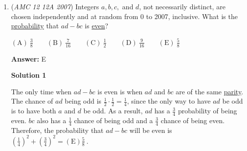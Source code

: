 \begin{enumerate}
 One way of finishing the sequence is by adding $568,682$ (before 824) to the sequence and adding them all together. After this, we just divide the result by each of the answer choices. Of the five, $37$ is the largest prime number that divides this sequence, so the answer is ${\boxed{(D)}}$.~Banspeedrun

 



\textbf{Solution 4 (a better way of doing solution 3)}

Because the question says which prime number will \textbf{ \textit{ ALWAYS }} divide $S$, the prime number would divide any sequence that follows the rule. So, to test this, create two sequences with three terms each- $111, 111, 111$ and $222, 222, 222$. The sum for both (respectively) is $333$ and $666$. Obviously, $3$ divides both. Now, test the other choices on both numbers, but don't if it doesn't divide one. An example is $\frac{333}{7}$. Because it doesn't divide, don't check $\frac{666}{7}$. Use the same logic for $\frac{333}{13}$. However, when you test $\frac{333}{37}$, it works. Now, you must check $\frac{666}{37}$ to ensure it isn't a special case. After doing this, you get that both are divisible. Now, check $\frac{333}{43}$ and see that it doesn't work. 

 
So the answer is ${\boxed{(D)}}$

 -N.

 


	\item (\textit{AMC 12 12A 2007}) Integers $a, b, c,$ and $d$, not necessarily distinct, are chosen independently and at random from 0 to 2007, inclusive. What is the \href{https://artofproblemsolving.com/wiki/index.php?title=Probability}{probability} that $ad-bc$ is \href{https://artofproblemsolving.com/wiki/index.php?title=Even}{even}?


 $\mathrm{(A)}\ \frac 38\qquad \mathrm{(B)}\ \frac 7{16}\qquad \mathrm{(C)}\ \frac 12\qquad \mathrm{(D)}\ \frac 9{16}\qquad \mathrm{(E)}\ \frac 58$

 \textbf{Answer: }E



\textbf{Solution 1}

The only time when $ad-bc$ is even is when $ad$ and $bc$ are of the same \href{https://artofproblemsolving.com/wiki/index.php?title=Parity}{parity}. The chance of $ad$ being odd is $\frac 12 \cdot \frac 12 = \frac 14$, since the only way to have $ad$ be odd is to have both $a$ and $d$ be odd. As a result, $ad$ has a $\frac 34$ probability of being even. $bc$ also has a $\frac 14$ chance of being odd and a $\frac34$ chance of being even. Therefore, the probability that $ad-bc$ will be even is $\left(\frac 14\right)^2+\left(\frac 34\right)^2=\boxed {\mathrm{(E )} \frac 58\ }$.


\end{enumerate}
